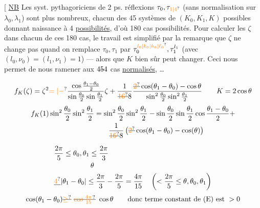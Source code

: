 [ \uline{NB} Les syst. pythagoriciens de 2 ps. réflexions $\tau_0,\tau_{\unsure{1|4}}$ (sans normalisation sur $\lambda_0,\lambda_1$) sont plus nombreux, chacun des 45 systèmes de  $(K_0,K_1,K)$ possibles donnant naissance à 4  \uline{possibilités}, d'où 180 cas possibilités. Pour calculer les $\zeta$ dans chacun de ces 180 cas, le travail est simplifié par la remarque que $\zeta$ ne
change pas quand on remplace $\tau_0,\tau_1$ par $\tau_0^{\unsure{l_0|k_0|h_0|\ell_0}},\tau_1^{l_1}$ (avec $(l_0,\nu_0)=(l_1,\nu_1)=1$) --- alors que $K$ bien sûr peut changer. Ceci nous permet de nous ramener aux $4\deleted{5}4$ cas \uline{normalisés},   \ldots

\[
f_K(\zeta)=\zeta^2\unsure{=|-}
\frac{\cos\frac{\theta_1-\theta_0}{2}}{\sin\frac{\theta_0}{2}\sin\frac{\theta_1}{2}}\zeta+
\frac{1}{\deleted{\unsure{16}}8}
\frac{\deleted{\unsure{2}}\cos(\theta_1-\theta_0)-\cos\theta}
{\sin^2\frac{\theta_0}{2}\sin^2\frac{\theta_1}{2}}
\qquad K=2\cos\theta
\]
\[
\begin{aligned}
f_K(1)\sin^2\frac{\theta_0}2\sin^2\frac{\theta_1}2
&=\sin^2\frac{\theta_0}2\sin^2\frac{\theta_1}2
-\sin\frac{\theta_0}2\sin\frac{\theta_1}2\cos\frac{\theta_1-\theta_0}2+\\
&\qquad\frac{1}{\deleted{\unsure{16}}8}
\left(\deleted{\unsure{2}}\cos(\theta_1-\theta_0)-\cos(\theta)\right)
\end{aligned}
\]

\[
\begin{aligned}
&\frac{2\pi}5\leq\theta_0,\theta_1\leq\frac{2\pi}3\\[-2pt]
&\hspace{1.8cm}\theta\\
&\deleted{\unsure{4}}|\theta_1-\theta_0|\leq\frac{2\pi}3-\frac{2\pi}5=\frac{4\pi}{15}
\quad\left(<\frac{2\pi}5\leq\theta,\theta_0,\theta_1\right)
\end{aligned}
\]
\[
\cos(\theta_1-\theta_0)\deleted{\unsure{\geq}}\ \deleted{\unsure{\cos\frac{4\pi}{15}}}\ \cos\theta
\qquad\text{donc terme constant de (E) est } >0
\]

